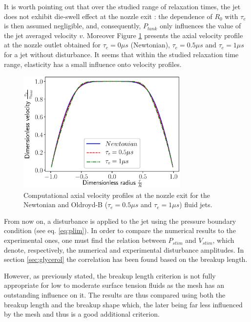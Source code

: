 \documentclass[twocolumn,10pt]{asme2ej}
\begin{document}
It is worth pointing out that over the studied range of relaxation times, the jet does not exhibit die-swell effect at the nozzle exit : the dependence of $R_0$ with $\tau_e$ is then assumed negligible, and, consequently, $P_{tank}$ only influences the value of the jet averaged velocity $v$. Moreover Figure \ref{fig:vProfiles} presents the axial velocity profile at the nozzle outlet obtained for $\tau_e = 0\mu s$ (Newtonian), $\tau_e = 0.5\mu s$ and $\tau_e = 1\mu s$ for a jet without disturbance. It seems that within the studied relaxation time range, elasticity has a small influence onto velocity profiles.

\begin{figure}[H]
    \centering
    \includegraphics[width=8.5cm]{rProfilesInk.eps}
    \caption{Computational axial velocity profiles at the nozzle exit for the Newtonian and Oldroyd-B ($\tau_e = 0.5\mu s$ and $\tau_e = 1\mu s$) fluid jets.}
    \label{fig:vProfiles}
\end{figure}

From now on, a disturbance is applied to the jet using the pressure boundary condition (see eq. \ref{eq:plim}). In order to compare the numerical results to the experimental ones, one must find the relation between $P_{stim}$ and $V_{stim}$, which denote, respectively, the numerical and experimental disturbance amplitudes. In section \ref{sec:glycerol} the correlation has been found based on the breakup length. 

However, as previously stated, the breakup length criterion is not fully appropriate for low to moderate surface tension fluids as the mesh has an outstanding influence on it. The results are thus compared using both the breakup length and the breakup shape which, the later being far less influenced by the mesh and thus is a good additional criterion.
\end{document}

